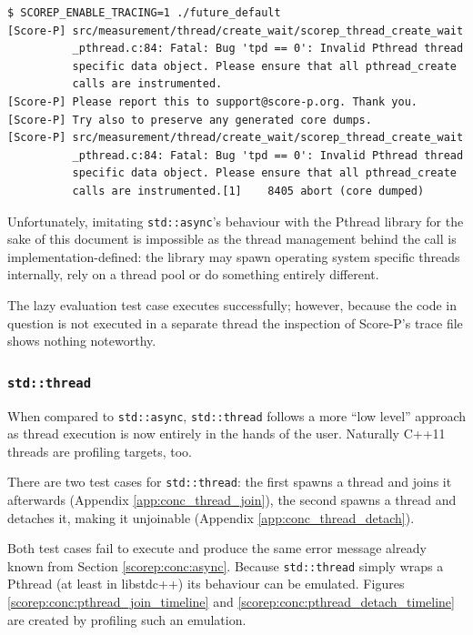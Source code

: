\begin{verbatim}
$ SCOREP_ENABLE_TRACING=1 ./future_default                                      
[Score-P] src/measurement/thread/create_wait/scorep_thread_create_wait
          _pthread.c:84: Fatal: Bug 'tpd == 0': Invalid Pthread thread
          specific data object. Please ensure that all pthread_create
          calls are instrumented.
[Score-P] Please report this to support@score-p.org. Thank you.
[Score-P] Try also to preserve any generated core dumps.
[Score-P] src/measurement/thread/create_wait/scorep_thread_create_wait
          _pthread.c:84: Fatal: Bug 'tpd == 0': Invalid Pthread thread
          specific data object. Please ensure that all pthread_create
          calls are instrumented.[1]    8405 abort (core dumped)
\end{verbatim}

\noindent Unfortunately, imitating \texttt{std::async}'s behaviour with the Pthread library for the sake of this document is impossible as the thread management behind the call is implementation-defined: the library may spawn operating system specific threads internally, rely on a thread pool or do something entirely different.

The lazy evaluation test case executes successfully; however, because the code in question is not executed in a separate thread the inspection of Score-P's trace file shows nothing noteworthy.

\subsubsection{\texttt{std::thread}}\label{scorep:conc:thread}

When compared to \texttt{std::async}, \texttt{std::thread} follows a more ``low level'' approach as thread execution is now entirely in the hands of the user. Naturally C++11 threads are profiling targets, too.

There are two test cases for \texttt{std::thread}: the first spawns a thread and joins it afterwards (Appendix \ref{app:conc_thread_join}), the second spawns a thread and detaches it, making it unjoinable (Appendix \ref{app:conc_thread_detach}).

Both test cases fail to execute and produce the same error message already known from Section \ref{scorep:conc:async}. Because \texttt{std::thread} simply wraps a Pthread (at least in libstdc++) its behaviour can be emulated. Figures \ref{scorep:conc:pthread_join_timeline} and \ref{scorep:conc:pthread_detach_timeline} are created by profiling such an emulation.

